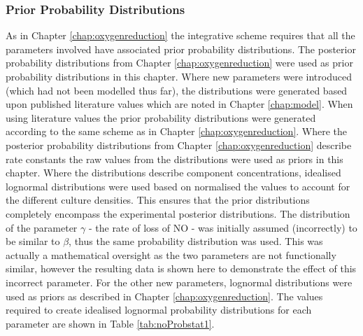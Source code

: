 \subsubsection{Prior Probability Distributions}
As in Chapter \ref{chap:oxygenreduction} the integrative scheme requires that all the parameters involved have associated prior probability distributions. The posterior probability distributions from Chapter \ref{chap:oxygenreduction} were used as prior probability distributions in this chapter. Where new parameters were introduced (which had not been modelled thus far), the distributions were generated based upon published literature values which are noted in Chapter \ref{chap:model}. When using literature values the prior probability distributions were generated according to the same scheme as in Chapter \ref{chap:oxygenreduction}. Where the posterior probability distributions from Chapter \ref{chap:oxygenreduction} describe rate constants the raw values from the distributions were used as priors in this chapter. Where the distributions describe component concentrations, idealised lognormal distributions were used based on normalised the values to account for the different culture densities. This ensures 
that the prior distributions completely encompass the experimental posterior distributions. The distribution of the parameter $\gamma$ - the rate of loss of NO - was initially assumed (incorrectly) to be similar to $\beta$, thus the same probability distribution was used. This was actually a mathematical oversight as the two parameters are not functionally similar, however the resulting data is shown here to demonstrate the effect of this incorrect parameter. For the other new parameters, lognormal distributions were used as priors as described in Chapter \ref{chap:oxygenreduction}. The values required to create idealised lognormal probability distributions for each parameter are shown in Table \ref{tab:noProbstat1}.

